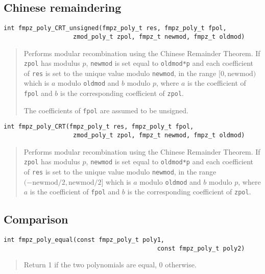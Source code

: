 \documentclass[a4paper,10pt]{article}
\newcommand{\code}{\lstinline}
\begin{document}
\subsection{Chinese remaindering}

\begin{lstlisting}
int fmpz_poly_CRT_unsigned(fmpz_poly_t res, fmpz_poly_t fpol, 
                   zmod_poly_t zpol, fmpz_t newmod, fmpz_t oldmod)
\end{lstlisting}
\begin{quote}
Performs modular recombination using the Chinese Remainder Theorem. If \code{zpol} has modulus $p$, \code{newmod} is set equal to \code{oldmod*p} and each coefficient of \code{res} is set to the unique value modulo \code{newmod}, in the range $[0, \mbox{newmod})$ which is $a$ modulo \code{oldmod} and $b$ modulo $p$, where $a$ is the coefficient of \code{fpol} and $b$ is the corresponding coefficient of \code{zpol}.

The coefficients of \code{fpol} are assumed to be unsigned. 
\end{quote}

\begin{lstlisting}
int fmpz_poly_CRT(fmpz_poly_t res, fmpz_poly_t fpol, 
                   zmod_poly_t zpol, fmpz_t newmod, fmpz_t oldmod)
\end{lstlisting}
\begin{quote}
Performs modular recombination using the Chinese Remainder Theorem. If \code{zpol} has modulus $p$, \code{newmod} is set equal to \code{oldmod*p} and each coefficient of \code{res} is set to the unique value modulo \code{newmod}, in the range $(-\mbox{newmod}/2, \mbox{newmod}/2]$ which is $a$ modulo \code{oldmod} and $b$ modulo $p$, where $a$ is the coefficient of \code{fpol} and $b$ is the corresponding coefficient of \code{zpol}. 
\end{quote}

\subsection{Comparison}


\begin{lstlisting}
int fmpz_poly_equal(const fmpz_poly_t poly1, 
                                          const fmpz_poly_t poly2) 
\end{lstlisting}
\begin{quote}
Return 1 if the two polynomials are equal, 0 otherwise.
\end{quote}
\end{document}

